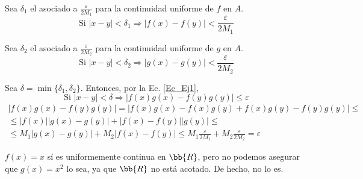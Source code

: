 \begin{ejercicio}
Sea $\delta_1$ el asociado a $\frac{\varepsilon}{2M_1}$ para la continuidad uniforme de $f$ en $A$.
$$\text{Si } |x-y|<\delta_1 \Longrightarrow |f(x)-f(y)|<\frac{\varepsilon}{2M_1}$$

Sea $\delta_2$ el asociado a $\frac{\varepsilon}{2M_2}$ para la continuidad uniforme de $g$ en $A$.
$$\text{Si } |x-y|<\delta_2 \Longrightarrow |g(x)-g(y)|<\frac{\varepsilon}{2M_2}$$


Sea $\delta = \min \{\delta_1, \delta_2\}$. Entonces, por la Ec. \ref{Ec_Ej1},
$$\text{Si } |x-y|<\delta \Longrightarrow |f(x)g(x)-f(y)g(y)| \leq \varepsilon$$
\begin{multline}\label{Ec_Ej1}
    |f(x)g(x) - f(y)g(y)| = |f(x)g(x) -f(x)g(y) + f(x)g(y) - f(y)g(y)|
    \leq \\ \leq
    |f(x)| |g(x) - g(y)| + |f(x) - f(y)||g(y)|
    \leq \\ \leq
    M_1 |g(x) - g(y)| + M_2|f(x) - f(y)| \leq
     M_1 \frac{\varepsilon}{2M_1} + M_2\frac{\varepsilon}{2M_2} = \varepsilon
\end{multline}

\begin{observacion}
    $f(x)=x$ sí es uniformemente continua en $\bb{R}$, pero no podemos asegurar que $g(x)=x^2$ lo sea, ya que $\bb{R}$ no está acotado. De hecho, no lo es.
\end{observacion}
\end{ejercicio}

